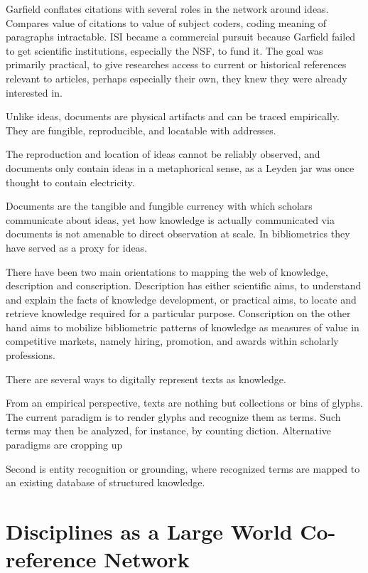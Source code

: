 \documentclass[]{book}
\theoremstyle{definition}
\theoremstyle{definition}
\theoremstyle{definition}
\theoremstyle{remark}
\begin{document}
\citep{Lederberg2000How} Garfield conflates citations with several roles
in the network around ideas. Compares value of citations to value of
subject coders, coding meaning of paragraphs intractable. ISI became a
commercial pursuit because Garfield failed to get scientific
institutions, especially the NSF, to fund it. The goal was primarily
practical, to give researches access to current or historical references
relevant to articles, perhaps especially their own, they knew they were
already interested in.

Unlike ideas, documents are physical artifacts and can be traced
empirically. They are fungible, reproducible, and locatable with
addresses.

The reproduction and location of ideas cannot be reliably observed, and
documents only contain ideas in a metaphorical sense, as a Leyden jar
was once thought to contain electricity.

Documents are the tangible and fungible currency with which scholars
communicate about ideas, yet how knowledge is actually communicated via
documents is not amenable to direct observation at scale. In
bibliometrics they have served as a proxy for ideas.

There have been two main orientations to mapping the web of knowledge,
description and conscription. Description has either scientific aims, to
understand and explain the facts of knowledge development, or practical
aims, to locate and retrieve knowledge required for a particular
purpose. Conscription on the other hand aims to mobilize bibliometric
patterns of knowledge as measures of value in competitive markets,
namely hiring, promotion, and awards within scholarly professions.

There are several ways to digitally represent texts as knowledge.

From an empirical perspective, texts are nothing but collections or bins
of glyphs. The current paradigm is to render glyphs and recognize them
as terms. Such terms may then be analyzed, for instance, by counting
diction. Alternative paradigms are cropping up

Second is entity recognition or grounding, where recognized terms are
mapped to an existing database of structured knowledge.

\citep{Pilkington2009evolution}

\hypertarget{disciplines-as-a-large-world-co-reference-network}{%
\section{Disciplines as a Large World Co-reference
Network}\label{disciplines-as-a-large-world-co-reference-network}}
\end{document}
